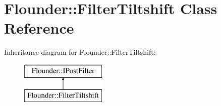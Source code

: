 \hypertarget{class_flounder_1_1_filter_tiltshift}{}\section{Flounder\+:\+:Filter\+Tiltshift Class Reference}
\label{class_flounder_1_1_filter_tiltshift}
Inheritance diagram for Flounder\+:\+:Filter\+Tiltshift\+:\begin{figure}[H]
\begin{center}
\leavevmode
\includegraphics[height=2.000000cm]{class_flounder_1_1_filter_tiltshift}
\end{center}
\end{figure}
